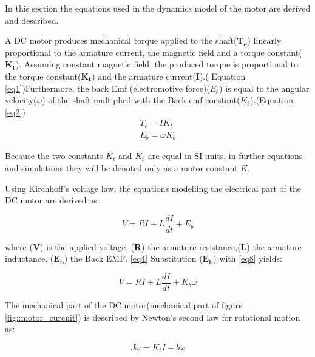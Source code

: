 In this section the equations used in the dynamics model of the motor are derived and described.

A DC motor produces mechanical torque applied to the shaft($\boldsymbol{T_e}$) linearly proportional to the armature current, the magnetic field and a torque constant($\boldsymbol{K_t}$). Assuming constant magnetic field, the produced torque is proportional to the torque constant($\boldsymbol{K_t}$) and the armature current(\textbf{I}).( Equation \ref{eq1})Furthermore, the back Emf (electromotive force)($E_b$) is equal to the angular velocity($\omega$) of the shaft multiplied with the Back emf constant($K_b$).(Equation \ref{eq2}) \\

\begin{align}  
T_e = IK_t \label{eq8}\\
E_b = \omega K_b \label{eq9}
\end{align}

Because the two constants $K_t$ and $K_b$ are equal in SI units, in further equations and simulations they will be denoted only as a motor constant $K$.



Using Kirchhoff's voltage law, the equations modelling the electrical part of the DC motor are derived as:

\begin{equation} \label{eq10}
V = RI + L\frac{dI}{dt} + E_b
\end{equation} 

where (\textbf{V}) is the applied voltage, (\textbf{R}) the armature resistance,(\textbf{L}) the armature inductance, ($\boldsymbol{E_b}$) the Back EMF. \ref{eq4}
Substitution ($\boldsymbol{E_b}$) with \ref{eq8} yields:

\begin{equation} \label{eq11}
V = RI + L\frac{dI}{dt} + K_b\omega
\end{equation}

The mechanical part of the DC motor(mechanical part of figure \ref{fig::motor_curcuit}) is described by Newton's second law for rotational motion as:

\begin{equation} \label{eq12}
J\dot{\omega} = K_tI - b\omega
\end{equation}

